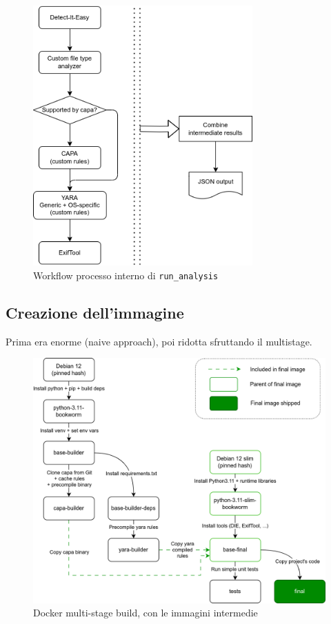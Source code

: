 \begin{figure}[htbp]
    \centering
    \includegraphics[width=0.75\textwidth]{assets/static_run_analysis_internal_tools.png}
    \caption{Workflow processo interno di \texttt{run\_analysis}}
    \label{fig:enter-label}
\end{figure}

\subsection{Creazione dell'immagine}
Prima era enorme (naive approach), poi ridotta sfruttando il multistage.

\begin{figure}[H]
    \centering
    \includegraphics[width=\textwidth]{assets/dockerfile.png}
    \caption{Docker multi-stage build, con le immagini intermedie}
    \label{fig:static_dockerfile_multistage_build}
\end{figure}


